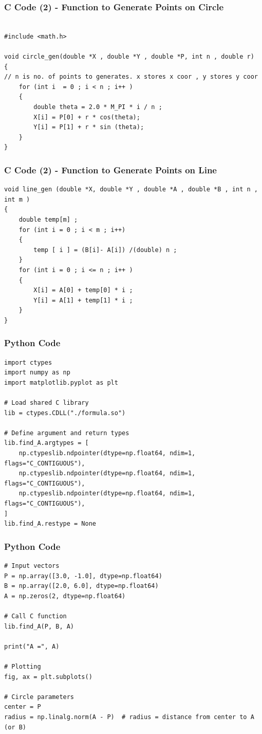 \documentclass{beamer}
\begin{document}
\begin{frame}[fragile]
    \frametitle{C Code (2) - Function to Generate Points on Circle}

    \begin{lstlisting}

#include <math.h>

void circle_gen(double *X , double *Y , double *P, int n , double r)
{
// n is no. of points to generates. x stores x coor , y stores y coor 
    for (int i  = 0 ; i < n ; i++ )
    {
        double theta = 2.0 * M_PI * i / n ; 
        X[i] = P[0] + r * cos(theta);
        Y[i] = P[1] + r * sin (theta); 
    }   
}
    \end{lstlisting}
\end{frame}
\begin{frame}[fragile]
    \frametitle{C Code (2) - Function to Generate Points on Line}

    \begin{lstlisting}
void line_gen (double *X, double *Y , double *A , double *B , int n , int m )
{
    double temp[m] ; 
    for (int i = 0 ; i < m ; i++)
    {
        temp [ i ] = (B[i]- A[i]) /(double) n ; 
    }
    for (int i = 0 ; i <= n ; i++ )
    {
        X[i] = A[0] + temp[0] * i ; 
        Y[i] = A[1] + temp[1] * i ;
    }
}

    \end{lstlisting}
\end{frame}
\begin{frame}[fragile]
    \frametitle{Python Code}
    \begin{lstlisting}
import ctypes
import numpy as np
import matplotlib.pyplot as plt

# Load shared C library
lib = ctypes.CDLL("./formula.so")

# Define argument and return types
lib.find_A.argtypes = [
    np.ctypeslib.ndpointer(dtype=np.float64, ndim=1, flags="C_CONTIGUOUS"),
    np.ctypeslib.ndpointer(dtype=np.float64, ndim=1, flags="C_CONTIGUOUS"),
    np.ctypeslib.ndpointer(dtype=np.float64, ndim=1, flags="C_CONTIGUOUS"),
]
lib.find_A.restype = None
\end{lstlisting}
\end{frame}

\begin{frame}[fragile]
    \frametitle{Python Code}
    \begin{lstlisting}
# Input vectors
P = np.array([3.0, -1.0], dtype=np.float64)
B = np.array([2.0, 6.0], dtype=np.float64)
A = np.zeros(2, dtype=np.float64)

# Call C function
lib.find_A(P, B, A)

print("A =", A)

# Plotting
fig, ax = plt.subplots()

# Circle parameters
center = P
radius = np.linalg.norm(A - P)  # radius = distance from center to A (or B)

\end{lstlisting}
\end{frame}
\end{document}

